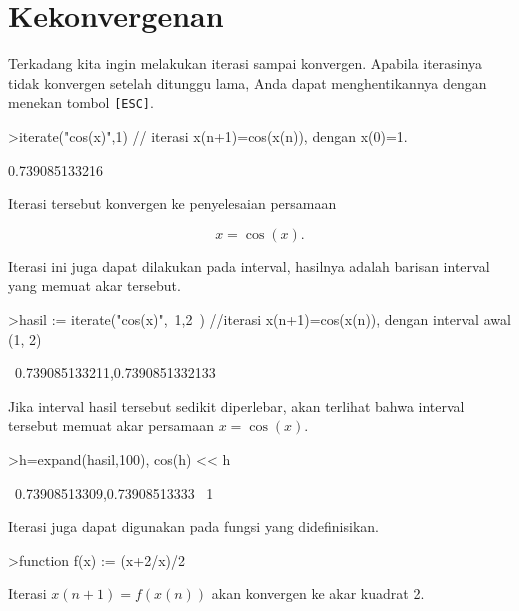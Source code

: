 \documentclass[a4paper,11pt,oneside,enabledeprecatedfontcommands]{scrbook}
\newenvironment{eulernotebook}{}{}
\newcommand{\eulersubheading}[1]{\section{#1}}
\newenvironment{eulercomment}{\par\medskip\noindent}{\par\medskip}
\newenvironment{eulerformula}{}{}
\begin{document}
\begin{eulernotebook}
\eulersubheading{Kekonvergenan}
\begin{eulercomment}
Terkadang kita ingin melakukan iterasi sampai konvergen. Apabila iterasinya tidak konvergen setelah ditunggu lama, Anda dapat menghentikannya dengan menekan tombol \texttt{[ESC]}.
\end{eulercomment}
\begin{eulerprompt}
>iterate("cos(x)",1) // iterasi x(n+1)=cos(x(n)), dengan x(0)=1.
\end{eulerprompt}
\begin{euleroutput}
  0.739085133216
\end{euleroutput}
\begin{eulercomment}
Iterasi tersebut konvergen ke penyelesaian persamaan
\end{eulercomment}
\begin{eulerformula}
\[
x = \cos(x).
\]
\end{eulerformula}
\begin{eulercomment}
Iterasi ini juga dapat dilakukan pada interval, hasilnya adalah barisan interval yang memuat akar tersebut.
\end{eulercomment}
\begin{eulerprompt}
>hasil := iterate("cos(x)",~1,2~) //iterasi x(n+1)=cos(x(n)), dengan interval awal (1, 2)
\end{eulerprompt}
\begin{euleroutput}
  ~0.739085133211,0.7390851332133~
\end{euleroutput}
\begin{eulercomment}
Jika interval hasil tersebut sedikit diperlebar, akan terlihat bahwa interval tersebut memuat akar persamaan $x=\cos(x)$.
\end{eulercomment}
\begin{eulerprompt}
>h=expand(hasil,100), cos(h) << h
\end{eulerprompt}
\begin{euleroutput}
  ~0.73908513309,0.73908513333~
  1
\end{euleroutput}
\begin{eulercomment}
Iterasi juga dapat digunakan pada fungsi yang didefinisikan.
\end{eulercomment}
\begin{eulerprompt}
>function f(x) := (x+2/x)/2
\end{eulerprompt}
\begin{eulercomment}
Iterasi $x(n+1)=f(x(n))$ akan konvergen ke akar kuadrat 2.
\end{eulercomment}

\end{eulernotebook}
\end{document}
